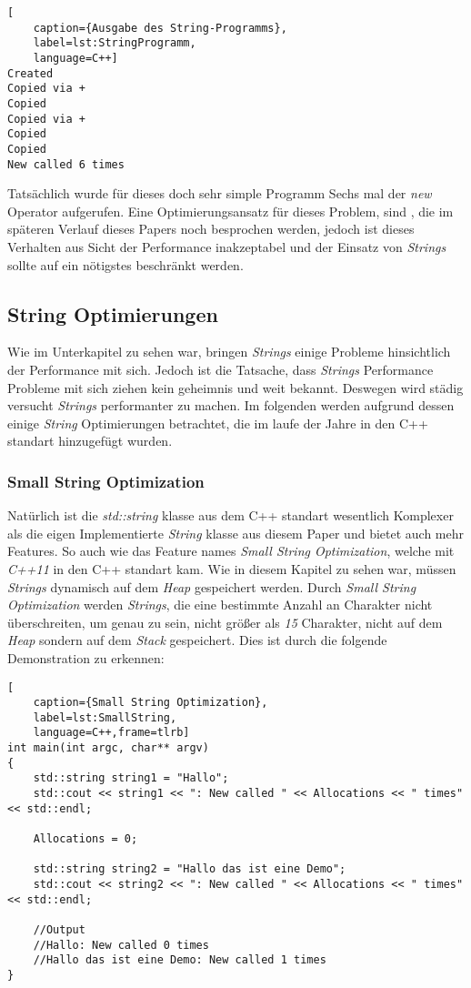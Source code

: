 \begin{lstlisting}[
    caption={Ausgabe des String-Programms},
    label=lst:StringProgramm,
    language=C++]
Created
Copied via +
Copied
Copied via +
Copied
Copied
New called 6 times
\end{lstlisting}

Tatsächlich wurde für dieses doch sehr simple Programm Sechs mal der \emph{new} Operator
aufgerufen. Eine Optimierungsansatz für dieses Problem, sind \emph{}, die im
späteren Verlauf dieses Papers noch besprochen werden, jedoch ist dieses Verhalten aus Sicht der
Performance inakzeptabel und der Einsatz von \emph{Strings} sollte auf ein nötigstes beschränkt
werden.

\subsection{String Optimierungen}
Wie im Unterkapitel \emph{} zu sehen war, bringen \emph{Strings}
einige Probleme hinsichtlich der Performance mit sich. Jedoch ist die Tatsache, dass
\emph{Strings} Performance Probleme mit sich ziehen kein geheimnis und weit bekannt. Deswegen
wird städig versucht \emph{Strings} performanter zu machen. Im folgenden werden aufgrund dessen
einige \emph{String} Optimierungen betrachtet, die im laufe der Jahre in den C++ standart
hinzugefügt wurden.
\newline
\subsubsection{Small String Optimization}
Natürlich ist die \emph{std::string} klasse aus dem C++ standart wesentlich Komplexer als die
eigen Implementierte \emph{String} klasse aus diesem Paper und bietet auch mehr Features. So auch
wie das Feature names \emph{Small String Optimization}, welche mit \emph{C++11} in den C++
standart kam. Wie in diesem Kapitel zu sehen war, müssen \emph{Strings} dynamisch auf dem
\emph{Heap} gespeichert werden. Durch \emph{Small String Optimization} werden \emph{Strings}, die
eine bestimmte Anzahl an Charakter nicht überschreiten, um genau zu sein, nicht größer als \emph{15}
Charakter, nicht auf dem \emph{Heap} sondern auf dem \emph{Stack} gespeichert. Dies ist durch die
folgende Demonstration zu erkennen:

\begin{lstlisting}[
	caption={Small String Optimization},
	label=lst:SmallString,
	language=C++,frame=tlrb]
int main(int argc, char** argv)
{
	std::string string1 = "Hallo";
	std::cout << string1 << ": New called " << Allocations << " times" << std::endl;

	Allocations = 0;

	std::string string2 = "Hallo das ist eine Demo";
	std::cout << string2 << ": New called " << Allocations << " times" << std::endl;

	//Output
	//Hallo: New called 0 times
	//Hallo das ist eine Demo: New called 1 times
}
\end{lstlisting}
\newline
